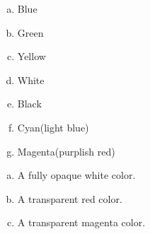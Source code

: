 \answers{}

\begin{Answer}[ref={rgb-triplet}]
  \begin{enumerate}[(a)]
  \item Blue
  \item Green
  \item Yellow
  \item White
  \item Black
  \item Cyan(light blue)
  \item Magenta(purplish red)
  \end{enumerate}
\end{Answer}

\begin{Answer}[ref={tga-16-bit}]

  \begin{enumerate}[(a)]
  \item A fully opaque white color.
  \item A transparent red color.
  \item A transparent magenta color.
  \end{enumerate}

\end{Answer}
